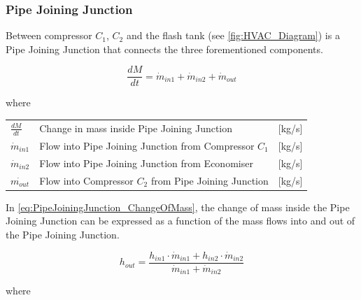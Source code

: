 \subsubsection{Pipe Joining Junction} 
Between compressor $ C_1 $, $ C_2 $ and the flash tank (see \cref{fig:HVAC_Diagram}) is a Pipe Joining Junction that connects the three forementioned components.

\begin{equation} \label{eq:PipeJoiningJunction_ChangeOfMass}
	\frac{dM}{dt} = \dot{m}_{in1} + \dot{m}_{in2} + \dot{m}_{out}
\end{equation}

where 

\begin{center}
	\begin{tabular}{l p{8cm} l}
		$\frac{dM}{dt}$ & Change in mass inside Pipe Joining Junction		 	& [\si{kg}/\si{s}]\\ 
		$\dot{m}_{in1}$ & Flow into Pipe Joining Junction from Compressor $ C_1 $ 		& [\si{kg}/\si{s}]\\
		$\dot{m}_{in2}$ & Flow into Pipe Joining Junction from Economiser 				& [\si{kg}/\si{s}]\\
		$\dot{m_{out}}$ & Flow into Compressor $ C_2 $ from Pipe Joining Junction		& [\si{kg}/\si{s}]\\
	\end{tabular}
\end{center}

In \cref{eq:PipeJoiningJunction_ChangeOfMass}, the change of mass inside the Pipe Joining Junction can be expressed as a function of the mass flows into and out of the Pipe Joining Junction. 

\begin{equation} \label{eq:PipeJoiningJunction_Enthalpy}
	h_{out} = \frac{h_{in1} \cdot \dot{m}_{in1} + h_{in2} \cdot \dot{m}_{in2}}{ \dot{m}_{in1} + \dot{m}_{in2} }
\end{equation}

where

